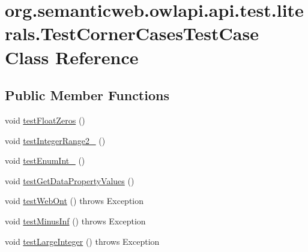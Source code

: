 \hypertarget{classorg_1_1semanticweb_1_1owlapi_1_1api_1_1test_1_1literals_1_1_test_corner_cases_test_case}{\section{org.\-semanticweb.\-owlapi.\-api.\-test.\-literals.\-Test\-Corner\-Cases\-Test\-Case Class Reference}
\label{classorg_1_1semanticweb_1_1owlapi_1_1api_1_1test_1_1literals_1_1_test_corner_cases_test_case}
}
\subsection*{Public Member Functions}
\begin{DoxyCompactItemize}
\item 
void \hyperlink{classorg_1_1semanticweb_1_1owlapi_1_1api_1_1test_1_1literals_1_1_test_corner_cases_test_case_a73bc5e31e05ef9eda3cf4612d605d416}{test\-Float\-Zeros} ()
\item 
void \hyperlink{classorg_1_1semanticweb_1_1owlapi_1_1api_1_1test_1_1literals_1_1_test_corner_cases_test_case_a1df29886319a03b952ac76b73da351ca}{test\-Integer\-Range2\-\_} ()
\item 
void \hyperlink{classorg_1_1semanticweb_1_1owlapi_1_1api_1_1test_1_1literals_1_1_test_corner_cases_test_case_a2f9f1d32b11df4d2ac20ce73f981d715}{test\-Enum\-Int\-\_} ()
\item 
void \hyperlink{classorg_1_1semanticweb_1_1owlapi_1_1api_1_1test_1_1literals_1_1_test_corner_cases_test_case_acce6334c872f1c91e54116997d016a49}{test\-Get\-Data\-Property\-Values} ()
\item 
void \hyperlink{classorg_1_1semanticweb_1_1owlapi_1_1api_1_1test_1_1literals_1_1_test_corner_cases_test_case_a0a38e65bcc4810cec40fff595b44f62e}{test\-Web\-Ont} ()  throws Exception 
\item 
void \hyperlink{classorg_1_1semanticweb_1_1owlapi_1_1api_1_1test_1_1literals_1_1_test_corner_cases_test_case_a76827d9b98563fd21a043eb64dd6519b}{test\-Minus\-Inf} ()  throws Exception 
\item 
void \hyperlink{classorg_1_1semanticweb_1_1owlapi_1_1api_1_1test_1_1literals_1_1_test_corner_cases_test_case_a002de2bb715e62218ba9f5cc0653e9a3}{test\-Large\-Integer} ()  throws Exception 
\end{DoxyCompactItemize}


